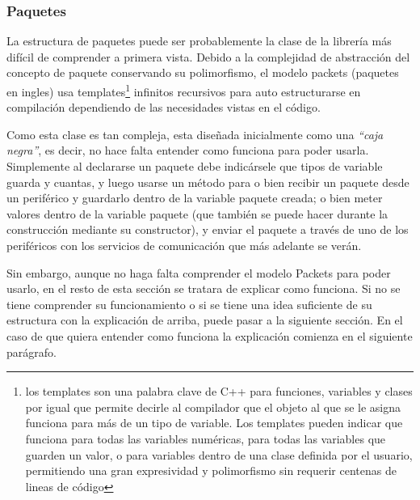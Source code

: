 \documentclass{report}
\begin{document}
\subsubsection{Paquetes}
La estructura de paquetes puede ser probablemente la clase de la librería más difícil de comprender a primera vista. Debido a la complejidad de abstracción del concepto de paquete conservando su polimorfismo, el modelo packets (paquetes en ingles) usa templates\footnote{los templates son una palabra clave de C++ para funciones, variables y clases por igual que permite decirle al compilador que el objeto al que se le asigna funciona para más de un tipo de variable. Los templates pueden indicar que funciona para todas las variables numéricas, para todas las variables que guarden un valor, o para variables dentro de una clase definida por el usuario, permitiendo una gran expresividad y polimorfismo sin requerir centenas de lineas de código} infinitos recursivos para auto estructurarse en compilación dependiendo de las necesidades vistas en el código. 
\par \vspace{0.3 cm}
Como esta clase es tan compleja, esta diseñada inicialmente como una \textit{``caja negra''}, es decir, no hace falta entender como funciona para poder usarla. Simplemente al declararse un paquete debe indicársele que tipos de variable guarda y cuantas, y luego usarse un método para o bien recibir un paquete desde un periférico y guardarlo dentro de la variable paquete creada; o bien meter valores dentro de la variable paquete (que también se puede hacer durante la construcción mediante su constructor), y enviar el paquete a través de uno de los periféricos con los servicios de comunicación que más adelante se verán. 
\par \vspace{0.3 cm}
Sin embargo, aunque no haga falta comprender el modelo Packets para poder usarlo, en el resto de esta sección se tratara de explicar como funciona. Si no se tiene comprender su funcionamiento o si se tiene una idea suficiente de su estructura con la explicación de arriba, puede pasar a la siguiente sección. En el caso de que quiera entender como funciona la explicación comienza en el siguiente parágrafo. 
\par \vspace{0.3 cm}
\end{document}
